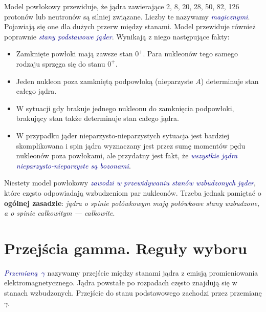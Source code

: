\documentclass{article}
\let\oldemph\emph
\renewcommand{\emph}[1]{\textcolor{darkblue}{\oldemph{#1}}}
\begin{document}
Model powłokowy przewiduje, że jądra zawierające {\color{darkblue} 2, 8, 20, 28, 50, 82, 126} protonów lub neutronów są silniej związane. Liczby te nazywamy \emph{magicznymi}. Pojawiają się one dla dużych przerw między stanami. Model przewiduje również poprawnie \emph{stany podstawowe jąder}. Wynikają z niego następujące fakty:
\begin{itemize}
    \item[$\star$] Zamknięte powłoki mają zawsze stan $0^+$. Para nukleonów tego samego rodzaju sprzęga się do stanu $0^+$.
    \item[$\star$] Jeden nukleon poza zamkniętą podpowłoką (nieparzyste $A$) determinuje stan całego jądra.
    \item[$\star$] W sytuacji gdy brakuje jednego nukleonu do zamknięcia podpowłoki, brakujący stan także determinuje stan całego jądra.
    \item[$\star$] W przypadku jąder nieparzysto-nieparzystych sytuacja jest bardziej skomplikowana i spin jądra wyznaczany jest przez sumę momentów pędu nukleonów poza powłokami, ale przydatny jest fakt, że \emph{wszystkie jądra nieparzysto-nieparzyste są bozonami}.    
\end{itemize}
Niestety model powłokowy \emph{zawodzi w przewidywaniu stanów wzbudzonych jąder}, które często odpowiadają wzbudzeniom par nukleonów. Trzeba jednak pamiętać o \textbf{ogólnej zasadzie}: \textit{jądra o spinie połówkowym mają połówkowe stany wzbudzone, a o spinie całkowitym --- całkowite}.





\section{Przejścia gamma. Reguły wyboru}
\label{sec:rozpad_gamma:25}

\emph{Przemianą $\gamma$} nazywamy przejście między stanami jądra z emisją promieniowania elektromagnetycznego. Jądra powstałe po rozpadach często znajdują się w stanach wzbudzonych. Przejście do stanu podstawowego zachodzi przez przemianę $\gamma$. 
\end{document}
